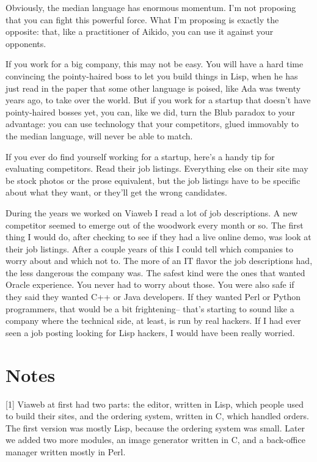 \documentclass[10pt,twoside,openright]{memoir}
\begin{document}
Obviously, the median language has enormous momentum. I'm not proposing that you can fight this powerful force. What I'm proposing is exactly the opposite: that, like a practitioner of Aikido, you can use it against your opponents.

If you work for a big company, this may not be easy. You will have a hard time convincing the pointy-haired boss to let you build things in Lisp, when he has just read in the paper that some other language is poised, like Ada was twenty years ago, to take over the world. But if you work for a startup that doesn't have pointy-haired bosses yet, you can, like we did, turn the Blub paradox to your advantage: you can use technology that your competitors, glued immovably to the median language, will never be able to match.

If you ever do find yourself working for a startup, here's a handy tip for evaluating competitors. Read their job listings. Everything else on their site may be stock photos or the prose equivalent, but the job listings have to be specific about what they want, or they'll get the wrong candidates.

During the years we worked on Viaweb I read a lot of job descriptions. A new competitor seemed to emerge out of the woodwork every month or so. The first thing I would do, after checking to see if they had a live online demo, was look at their job listings. After a couple years of this I could tell which companies to worry about and which not to. The more of an IT flavor the job descriptions had, the less dangerous the company was. The safest kind were the ones that wanted Oracle experience. You never had to worry about those. You were also safe if they said they wanted C++ or Java developers. If they wanted Perl or Python programmers, that would be a bit frightening-- that's starting to sound like a company where the technical side, at least, is run by real hackers. If I had ever seen a job posting looking for Lisp hackers, I would have been really worried.

\section{Notes}

[1] Viaweb at first had two parts: the editor, written in Lisp, which people used to build their sites, and the ordering system, written in C, which handled orders. The first version was mostly Lisp, because the ordering system was small. Later we added two more modules, an image generator written in C, and a back-office manager written mostly in Perl.
\end{document}
